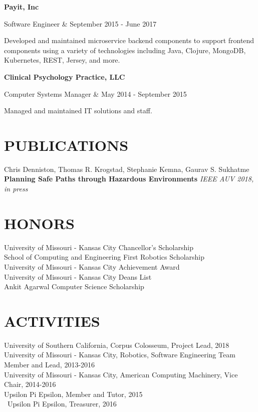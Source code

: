 \documentclass[margin,10pt]{res} %
\begin{document}
\begin{resume}
        {\bf Payit, Inc} \\
            \begin{ncolumn}{2}
            Software Engineer & September 2015 - June 2017
            \end{ncolumn}
            Developed and maintained microservice backend components to support frontend components using a variety of technologies including Java, Clojure, MongoDB, Kubernetes, REST, Jersey, and more.
            
        {\bf Clinical Psychology Practice, LLC} \\
            \begin{ncolumn}{2}
            Computer Systems Manager & May 2014 - September 2015
            \end{ncolumn}
            Managed and maintained IT solutions and staff.

\section{PUBLICATIONS}
Chris Denniston, Thomas R. Krogstad, Stephanie Kemna, Gaurav S. Sukhatme \textbf{Planning Safe Paths through Hazardous Environments} \textit{IEEE AUV 2018, in press} 
 
\section{HONORS}
University of Missouri - Kansas City Chancellor's Scholarship \\
School of Computing and Engineering First Robotics Scholarship \\ 
University of Missouri - Kansas City Achievement Award  \\
University of Missouri - Kansas City Deans List \\
Ankit Agarwal Computer Science Scholarship

 
\section{ACTIVITIES}
University of Southern California, Corpus Colosseum, Project Lead, 2018 \\
University of Missouri - Kansas City, Robotics, Software Engineering Team Member and Lead, 2013-2016 \\
University of Missouri - Kansas City, American Computing Machinery, Vice Chair, 2014-2016\\
Upsilon Pi Epsilon, Member and Tutor, 2015 \\\
Upsilon Pi Epsilon, Treasurer, 2016

\end{resume} 
\end{document}
